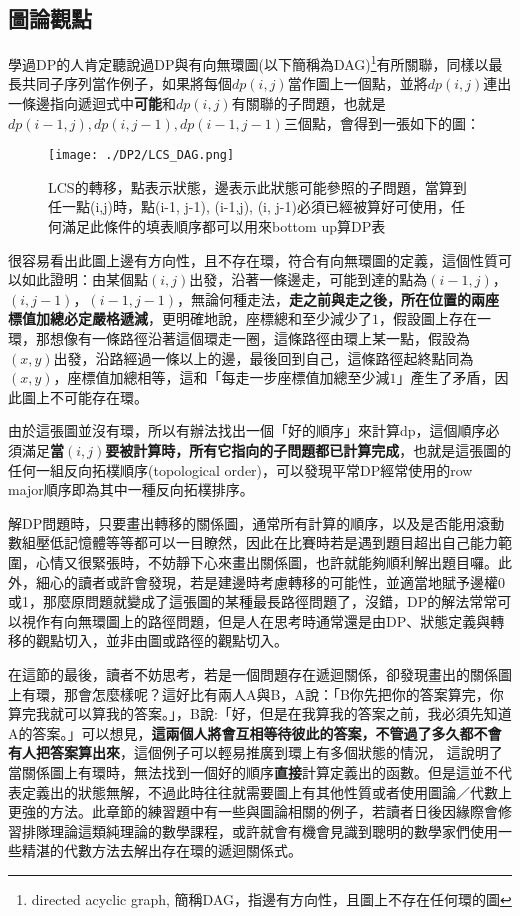 \subsection{圖論觀點}
\label{sec:dp2:theory:graph}
學過DP的人肯定聽說過DP與有向無環圖(以下簡稱為DAG)\footnote{directed acyclic graph, 簡稱DAG，指邊有方向性，且圖上不存在任何環的圖}有所關聯，同樣以最長共同子序列當作例子，如果將每個$dp(i, j)$當作圖上一個點，並將$dp(i, j)$連出一條邊指向遞迴式中\textbf{可能}和$dp(i, j)$有關聯的子問題，也就是$dp(i - 1, j), dp(i, j - 1), dp(i - 1, j - 1)$三個點，會得到一張如下的圖：\\
\begin{figure}[h]
	\begin{center}
		\centerline{\texttt{[image: ./DP2/LCS\_DAG.png]}}
		\caption{LCS的轉移，點表示狀態，邊表示此狀態可能參照的子問題，當算到任一點(i,j)時，點(i-1, j-1), (i-1,j), (i, j-1)必須已經被算好可使用，任何滿足此條件的填表順序都可以用來bottom up算DP表}
		\label{figure:dp2:LCS_DAG}
	\end{center}
\end{figure}

很容易看出此圖上邊有方向性，且不存在環，符合有向無環圖的定義，這個性質可以如此證明：由某個點$(i, j)$出發，沿著一條邊走，可能到達的點為$(i - 1, j)$，$(i, j - 1)$，$(i - 1, j - 1)$，無論何種走法，\textbf{走之前與走之後，所在位置的兩座標值加總必定嚴格遞減}，更明確地說，座標總和至少減少了$1$，假設圖上存在一環，那想像有一條路徑沿著這個環走一圈，這條路徑由環上某一點，假設為$(x, y)$出發，沿路經過一條以上的邊，最後回到自己，這條路徑起終點同為$(x, y)$，座標值加總相等，這和「每走一步座標值加總至少減$1$」產生了矛盾，因此圖上不可能存在環。

由於這張圖並沒有環，所以有辦法找出一個「好的順序」來計算dp，這個順序必須滿足\textbf{當$(i, j)$要被計算時，所有它指向的子問題都已計算完成}，也就是這張圖的任何一組反向拓樸順序(topological order)，可以發現平常DP經常使用的row major順序即為其中一種反向拓樸排序。

解DP問題時，只要畫出轉移的關係圖，通常所有計算的順序，以及是否能用滾動數組壓低記憶體等等都可以一目瞭然，因此在比賽時若是遇到題目超出自己能力範圍，心情又很緊張時，不妨靜下心來畫出關係圖，也許就能夠順利解出題目囉。此外，細心的讀者或許會發現，若是建邊時考慮轉移的可能性，並適當地賦予邊權0或1，那麼原問題就變成了這張圖的某種最長路徑問題了，沒錯，DP的解法常常可以視作有向無環圖上的路徑問題，但是人在思考時通常還是由DP、狀態定義與轉移的觀點切入，並非由圖或路徑的觀點切入。

在這節的最後，讀者不妨思考，若是一個問題存在遞迴關係，卻發現畫出的關係圖上有環，那會怎麼樣呢？這好比有兩人A與B，A說：「B你先把你的答案算完，你算完我就可以算我的答案。」，B說:「好，但是在我算我的答案之前，我必須先知道A的答案。」可以想見，\textbf{這兩個人將會互相等待彼此的答案，不管過了多久都不會有人把答案算出來}，這個例子可以輕易推廣到環上有多個狀態的情況，
這說明了當關係圖上有環時，無法找到一個好的順序\textbf{直接}計算定義出的函數。但是這並不代表定義出的狀態無解，不過此時往往就需要圖上有其他性質或者使用圖論／代數上更強的方法。此章節的練習題中有一些與圖論相關的例子，若讀者日後因緣際會修習排隊理論這類純理論的數學課程，或許就會有機會見識到聰明的數學家們使用一些精湛的代數方法去解出存在環的遞迴關係式。


